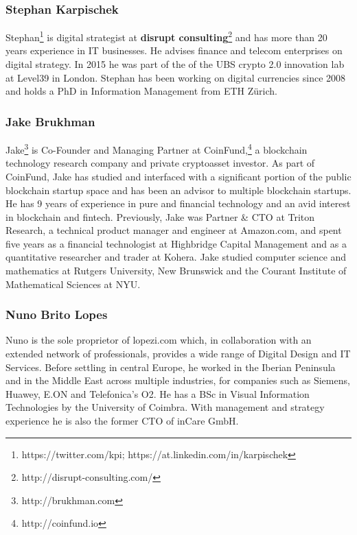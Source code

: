\documentclass[12pt]{article}
\begin{document}
\subsubsection{Stephan Karpischek}

Stephan\footnote{https://twitter.com/kpi; https://at.linkedin.com/in/karpischek}
 is digital strategist at \textbf{disrupt consulting}\footnote{http://disrupt-consulting.com/} and has more than 20 years experience in IT businesses. He advises finance and telecom enterprises on digital strategy. In 2015 he was part of the of the UBS crypto 2.0 innovation lab at Level39 in London. Stephan has been working on digital currencies since 2008 and holds a PhD in Information Management from ETH Zürich.
 
\subsubsection{Jake Brukhman}

Jake\footnote{http://brukhman.com} is Co-Founder and Managing Partner at CoinFund,\footnote{http://coinfund.io} a blockchain technology research company and private cryptoasset investor. As part of CoinFund, Jake has studied and interfaced with a significant portion of the public blockchain startup space and has been an advisor to multiple blockchain startups. He has 9 years of experience in pure and financial technology and an avid interest in blockchain and fintech. Previously, Jake was Partner \& CTO at Triton Research, a technical product manager and engineer at Amazon.com, and spent five years as a financial technologist at Highbridge Capital Management and as a quantitative researcher and trader at Kohera. Jake studied computer science and mathematics at Rutgers University, New Brunswick and the Courant Institute of Mathematical Sciences at NYU.

\subsubsection{Nuno Brito Lopes}

Nuno is the sole proprietor of lopezi.com which, in collaboration with an extended network of professionals, provides a wide range of Digital Design and IT Services. Before settling in central Europe, he worked in the Iberian Peninsula and in the Middle East across multiple industries, for companies such as Siemens, Huawey, E.ON and Telefonica’s O2. He has a BSc in Visual Information Technologies by the University of Coimbra. With management and strategy experience he is also the former CTO of inCare GmbH. 
\end{document}
